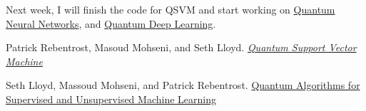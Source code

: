 \documentclass[11pt]{article}
\begin{document}
Next week, I will finish the code for QSVM and start working on \href{http://axon.cs.byu.edu/Dan/papers/ezhov2000fdisis.pdf}{Quantum Neural Networks}, and \href{https://arxiv.org/pdf/1412.3489.pdf}{Quantum Deep Learning}. 


\medbreak

\begin{thebibliography}{9}
Patrick Rebentrost, Masoud Mohseni, and Seth Lloyd. 
\href{https://arxiv.org/abs/1307.0471?context=cs}{\textit{Quantum Support Vector Machine}}

Seth Lloyd, Massoud Mohseni, and Patrick Rebentrost. 
\href{https://arxiv.org/abs/1307.0411}{Quantum Algorithms for Supervised and Unsupervised Machine Learning}


\end{thebibliography}
\end{document}
